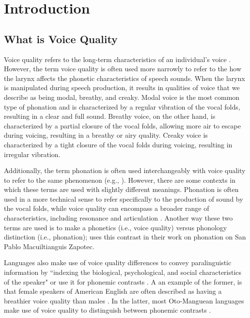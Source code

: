 \chapter{Introduction} \label{chap:introduction}


\section{What is Voice Quality} \label{sec:voice_quality}
Voice quality refers to the long-term characteristics of an individual's voice \citep{abercrombieElementsGeneralPhonetics1967,laverPhoneticDescriptionVoice1980}. However, the term voice quality is often used more narrowly to refer to the how the larynx affects the phonetic characteristics of speech sounds. When the larynx is manipulated during speech production, it results in qualities of voice that we describe as being modal, breathy, and creaky. Modal voice is the most common type of phonation and is characterized by a regular vibration of the vocal folds, resulting in a clear and full sound. Breathy voice, on the other hand, is characterized by a partial closure of the vocal folds, allowing more air to escape during voicing, resulting in a breathy or airy quality. Creaky voice is characterized by a tight closure of the vocal folds during voicing, resulting in irregular vibration.

Additionally, the term phonation is often used interchangeably with voice quality to refer to the same phenomenon (e.g., \cite{keatingPhonationContrastsLanguages}). However, there are some contexts in which these terms are used with slightly different meanings. Phonation is often used in a more technical sense to refer specifically to the production of sound by the vocal folds, while voice quality can encompass a broader range of characteristics, including resonance and articulation \citep{eslingVoiceQualityLaryngeal2019}. Another way these two terms are used is to make a phonetics (i.e., voice quality) versus phonology distinction (i.e., phonation); \citet{barzilaiContextdependentPhoneticEnhancement2021} uses this contrast in their work on phonation on San Pablo Macuiltianguis Zapotec. 

Languages also make use of voice quality differences to convey paralinguistic information by ``indexing the biological, psychological, and social characteristics of the speaker" \citep{laverVoiceQualityIndexical1968,podesvaStanceWindowLanguageRace2016} or use it for phonemic contrasts \citep{ladefogedSoundsWorldsLanguages1996}. A an example of the former, is that female speakers of American English are often described as having a breathier voice quality than males \citep[e.g.,][]{klattAnalysisSynthesisPerception1990}. In the latter, most Oto-Manguean languages make use of voice quality to distinguish between phonemic contrasts \citep{lillehaugenOtomangueanLanguages2019}.



